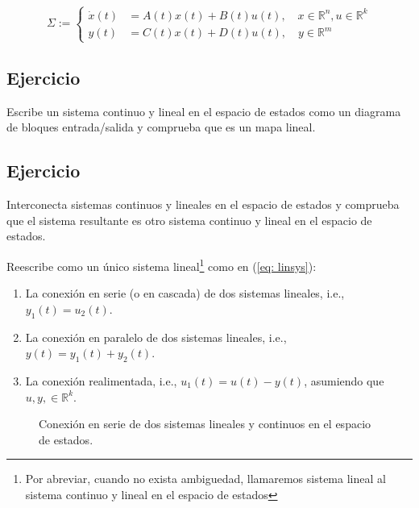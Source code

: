 \begin{equation}
	\Sigma := \begin{cases}
	\dot x(t) &= A(t)x(t) + B(t)u(t), \quad x\in\mathbb{R}^n, u\in\mathbb{R}^k \\
	y(t) &= C(t)x(t) + D(t)u(t), \quad y\in\mathbb{R}^m
	\end{cases}
	\label{eq: linsys}
\end{equation}

\subsection*{Ejercicio}
 Escribe un sistema continuo y lineal en el espacio de estados como un diagrama de bloques entrada/salida y comprueba que es un mapa lineal.

\subsection*{Ejercicio}
Interconecta sistemas continuos y lineales en el espacio de estados y comprueba que el sistema resultante es otro sistema continuo y lineal en el espacio de estados.

Reescribe como un único sistema lineal\footnote{Por abreviar, cuando no exista ambiguedad, llamaremos sistema lineal al sistema continuo y lineal en el espacio de estados} como en (\ref{eq: linsys}):

\begin{enumerate}
	\item La conexión en serie (o en cascada) de dos sistemas lineales, i.e., $y_1(t) = u_2(t)$.
	\item La conexión en paralelo de dos sistemas lineales, i.e., $y(t) = y_1(t) + y_2(t)$.
	\item La conexión realimentada, i.e., $u_1(t) = u(t) - y(t)$, asumiendo que $u, y, \in\mathbb{R}^k$.
\end{enumerate}

\begin{figure}
\centering
{}
	\caption{Conexión en serie de dos sistemas lineales y continuos en el espacio de estados.}
	\label{fig: series}
\end{figure}

